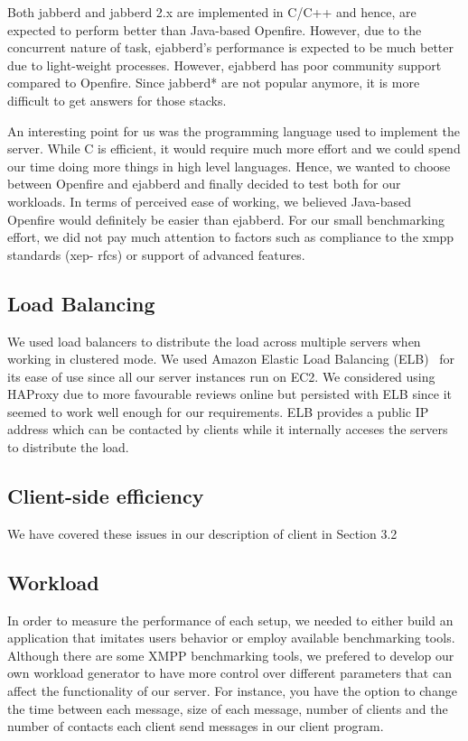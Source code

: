 \documentclass[a4paper, twocolumn]{article}
\begin{document}
Both jabberd and jabberd 2.x are implemented in C/C++ and hence, are expected to perform better than Java-based Openfire. However, due to the concurrent nature of task, ejabberd's performance is expected to be much better due to light-weight processes. However, ejabberd has poor community support compared to Openfire. Since jabberd* are not popular anymore, it is more difficult to get answers for those stacks. 

An interesting point for us was the programming language used to implement the server. While C is efficient, it would require much more effort and we could spend our time doing more things in high level languages. Hence, we wanted to choose between Openfire and ejabberd and finally decided to test both for our workloads. In terms of perceived ease of working, we believed Java-based Openfire would definitely be easier than ejabberd. For our small benchmarking effort, we did not pay much attention to factors such as compliance to the xmpp standards (xep- rfcs) or support of advanced features. 


\subsection{Load Balancing}
We used load balancers to distribute the load across multiple servers when working in clustered mode. We used Amazon Elastic Load Balancing (ELB)~\cite{ec2_2} for its ease of use since all our server instances run on EC2. We considered using HAProxy due to more favourable reviews online but persisted with ELB since it seemed to work well enough for our requirements. ELB provides a public IP address which can be contacted by clients while it internally acceses the servers to distribute the load. 

\subsection{Client-side efficiency}
We have covered these issues in our description of client in Section 3.2

\subsection{Workload}
In order to measure the performance of each setup, we needed to either build an application that imitates users behavior or employ available benchmarking tools. Although there are some XMPP benchmarking tools, we prefered to develop our own workload generator to have more control over different parameters that can affect the functionality of our server. For instance, you have the option to change the time between each message, size of each message, number of clients and the number of contacts each client send messages in our client program.
\end{document}

